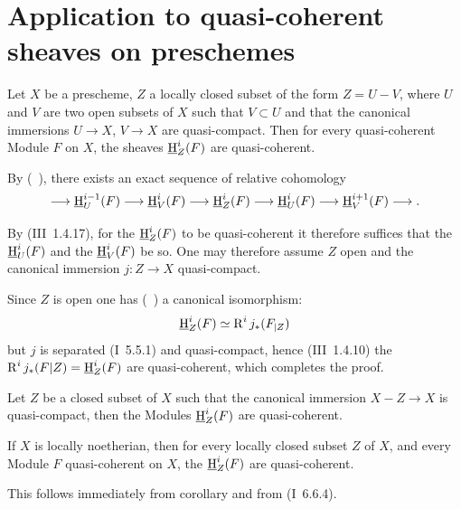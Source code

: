 \chapter[Quasi-coherent sheaves on preschemes]{Application to quasi-coherent sheaves on preschemes} \label{II}


\begin{supproposition} \label{II.1}
Let $X$ be a prescheme, $Z$ a locally closed subset of the form $Z=U-V$, where $U$ and $V$ are two open subsets of $X$ such that $V\subset U$ and that the canonical immersions $U\to X$, $V\to X$ are quasi-compact. Then for every quasi-coherent Module $F$ on $X$, the sheaves ${\operatorname{\underline{H}}}_Z^i(F)$ are quasi-coherent.
\end{supproposition}

By (~), there exists an exact sequence of relative cohomology
\[
\to {\SheafH}_U^{i-1}(F) \to {\SheafH}_V^{i}(F) \to {\SheafH}_Z^{i}(F) \to {\SheafH}_U^{i}(F) \to {\SheafH}_V^{i+1}(F) \to.
\]

By (\EGA III~1.4.17), for the ${\operatorname{\underline{H}}}_Z^i(F)$ to be quasi-coherent it therefore suffices that the ${\operatorname{\underline{H}}}_U^i(F)$ and the ${\operatorname{\underline{H}}}_V^i(F)$ be so. One may therefore assume $Z$ open and the canonical immersion $j:Z\to X$ quasi-compact.

Since $Z$ is open one has (~) a canonical isomorphism:
\[
{\operatorname{\underline{H}}}_Z^{i}(F) \simeq \operatorname{R}^ij_{*}(F_{|Z})
\]
but $j$ is separated (\EGA I~5.5.1) and quasi-compact, hence (\EGA III~1.4.10) the $\operatorname{R}^ij_{*}(F|Z)={\operatorname{\underline{H}}}_Z^{i}(F)$ are quasi-coherent, which completes the proof.

\begin{supcorollary} \label{II.2}
Let $Z$ be a closed subset of $X$ such that the canonical immersion \hbox{$X-Z\to X$} is quasi-compact, then the Modules ${\operatorname{\underline{H}}}_Z^i(F)$ are quasi-coherent.
\end{supcorollary}

\begin{supcorollary} \label{II.3}
If $X$ is locally noetherian, then for every locally closed subset $Z$ of $X$, and every Module $F$ quasi-coherent on $X$, the ${\operatorname{\underline{H}}}_Z^i(F)$ are quasi-coherent.
\end{supcorollary}

This follows immediately from corollary  and from (\EGA I~6.6.4).

